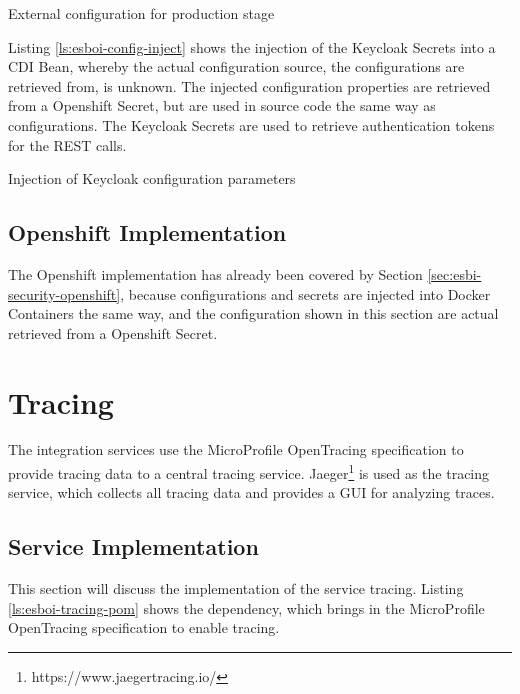 \begin{listing}
	\caption{External configuration for production stage}
	\label{ls:esboi-config-project-stages-prod}
\end{listing}

Listing \vref{ls:esboi-config-inject} shows the injection of the Keycloak Secrets into a CDI Bean, whereby the actual configuration source, the configurations are retrieved from, is unknown. The injected configuration properties are retrieved from a Openshift Secret, but are used in source code the same way as configurations. The Keycloak Secrets are used to retrieve authentication tokens for the REST calls. 

\begin{listing}
	\caption{Injection of Keycloak configuration parameters}
	\label{ls:esboi-config-inject}
\end{listing}

\subsection{Openshift Implementation}
\label{sec:esbi-config-openshift}
The Openshift implementation has already been covered by Section \vref{sec:esbi-security-openshift}, because configurations and secrets are injected into Docker Containers the same way, and the configuration shown in this section are actual retrieved from a Openshift Secret. 

\section{Tracing}
\label{sec:esbi-tracing}
The integration services use the MicroProfile OpenTracing specification to provide tracing data to a central tracing service. Jaeger\footnote{https://www.jaegertracing.io/} is used as the tracing service, which collects all tracing data and provides a GUI for analyzing traces. 

\subsection{Service Implementation}
\label{sec:esbi-tracing-service}
This section will discuss the implementation of the service tracing. Listing \vref{ls:esboi-tracing-pom} shows the dependency, which brings in the MicroProfile OpenTracing specification to enable tracing. 

